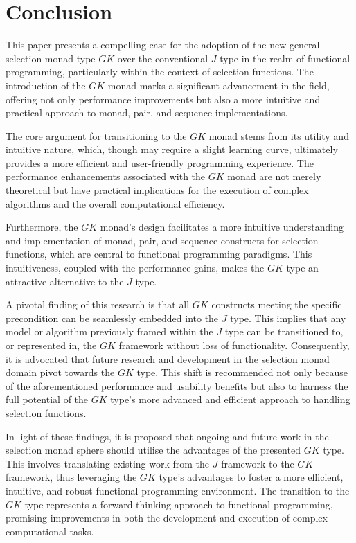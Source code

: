 \documentclass[runningheads]{llncs}
\begin{document}
\section{Conclusion}\label{conclusion}

This paper presents a compelling case for the adoption of the new
general selection monad type \(GK\) over the conventional \(J\) type in
the realm of functional programming, particularly within the context of
selection functions. The introduction of the \(GK\) monad marks a
significant advancement in the field, offering not only performance
improvements but also a more intuitive and practical approach to monad,
pair, and sequence implementations.

The core argument for transitioning to the \(GK\) monad stems from its
utility and intuitive nature, which, though may require a slight
learning curve, ultimately provides a more efficient and user-friendly
programming experience. The performance enhancements associated with the
\(GK\) monad are not merely theoretical but have practical implications
for the execution of complex algorithms and the overall computational
efficiency.

Furthermore, the \(GK\) monad's design facilitates a more intuitive
understanding and implementation of monad, pair, and sequence constructs
for selection functions, which are central to functional programming
paradigms. This intuitiveness, coupled with the performance gains, makes
the \(GK\) type an attractive alternative to the \(J\) type.

A pivotal finding of this research is that all \(GK\) constructs meeting
the specific precondition can be seamlessly embedded into the \(J\)
type. This implies that any model or algorithm previously framed within
the \(J\) type can be transitioned to, or represented in, the \(GK\)
framework without loss of functionality. Consequently, it is advocated
that future research and development in the selection monad domain pivot
towards the \(GK\) type. This shift is recommended not only because of
the aforementioned performance and usability benefits but also to
harness the full potential of the \(GK\) type's more advanced and
efficient approach to handling selection functions.

In light of these findings, it is proposed that ongoing and future work
in the selection monad sphere should utilise the advantages of the
presented \(GK\) type. This involves translating existing work from the
\(J\) framework to the \(GK\) framework, thus leveraging the \(GK\)
type's advantages to foster a more efficient, intuitive, and robust
functional programming environment. The transition to the \(GK\) type
represents a forward-thinking approach to functional programming,
promising improvements in both the development and execution of complex
computational tasks.
\end{document}

